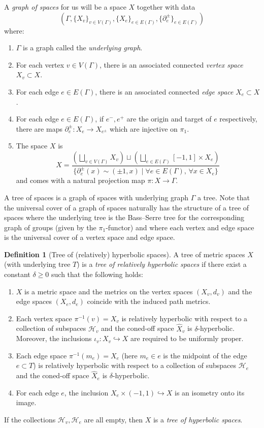 \documentclass[11pt, a4paper]{amsart}
\theoremstyle{definition}
\newtheorem{definition}[theorem]{Definition}
\newcommand{\wh}[1]{\widehat{ #1 }}
\def\injects{\hookrightarrow}
\begin{document}
A \emph{graph of spaces} for us will be a space $X$ together with data 
\[
\left(\Gamma, \{X_v\}_{v\in V(\Gamma)}, \{X_e\}_{e\in E(\Gamma)}, \{\partial^{\pm}_e\}_{e\in E(\Gamma)}\right)
\]
where:
\begin{enumerate}
\item $\Gamma$ is a graph called the \emph{underlying graph}.
\item For each vertex $v\in V(\Gamma)$, there is an associated connected \emph{vertex space} $X_v\subset X$.
\item For each edge $e\in E(\Gamma)$, there is an associated connected \emph{edge space} $X_e\subset X$.
\item For each edge $e\in E(\Gamma)$, if $e^-, e^+$ are the origin and target of $e$ respectively, there are maps $\partial_e^{\pm}\colon X_e\to X_{e^{\pm}}$ which are injective on $\pi_1$.
\item The space $X$ is
\[
X = \frac{\left(\bigsqcup_{v\in V(\Gamma)}X_v\right)\sqcup\left(\bigsqcup_{e\in E(\Gamma)}[-1, 1]\times X_e\right)}{\{\partial^{\pm}_e(x) \sim (\pm1, x) \mid \forall e\in E(\Gamma), \, \forall x\in X_e\}}
\]
and comes with a natural projection map $\pi\colon X \to \Gamma$.
\end{enumerate}
A tree of spaces is a graph of spaces with underlying graph $\Gamma$ a tree. Note that the universal cover of a graph of spaces naturally has the structure of a tree of spaces where the underlying tree is the Bass--Serre tree for the corresponding graph of groups (given by the $\pi_1$-functor) and where each vertex and edge space is the universal cover of a vertex space and edge space.


\begin{definition}[Tree of (relatively) hyperbolic spaces]
A tree of metric spaces $X$ (with underlying tree $T$) is a \emph{tree of relatively hyperbolic spaces} if there exist a constant $\delta\geqslant 0$ such that the following holds:
\begin{enumerate}
\item $X$ is a metric space and the metrics on the vertex spaces $(X_v, d_v)$ and the edge spaces $(X_e, d_e)$ coincide with the induced path metrics.
\item Each vertex space $\pi^{-1}(v) = X_v$ is relatively hyperbolic with respect to a collection of subspaces $\mathcal{H}_v$ and the coned-off space $\wh{X}_v$ is $\delta$-hyperbolic. Moreover, the inclusions $\iota_v\colon X_v\injects X$ are required to be uniformly proper.
\item Each edge space $\pi^{-1}(m_e) = X_e$ (here $m_e\in e$ is the midpoint of the edge $e\subset T$) is relatively hyperbolic with respect to a collection of subspaces $\mathcal{H}_e$ and the coned-off space $\wh{X}_e$ is $\delta$-hyperbolic.
\item For each edge $e$, the inclusion $X_e\times(-1, 1)\injects X$ is an isometry onto its image.
\end{enumerate}
If the collections $\mathcal{H}_v, \mathcal{H}_e$ are all empty, then $X$ is a \emph{tree of hyperbolic spaces}.
\end{definition}
\end{document}
